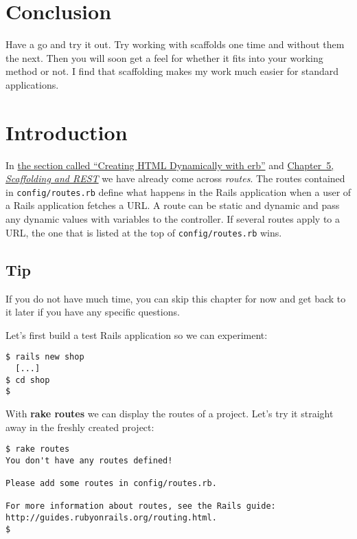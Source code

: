 \documentclass[a4paper]{book}
\newcommand{\chap}[1]{\newpage\thispagestyle{empty}\chapter{#1}\label{chap:\thechapter}}
\begin{document}
\section{Conclusion}\label{conclusion}

Have a go and try it out. Try working with scaffolds one time and without them the next. Then you will soon get a feel for whether it fits into your working method or not. I find that scaffolding makes my work much easier for standard applications.

\hyperdef{}{routes}{\chap{Routes}\label{routes}}

\section{Introduction}\label{introduction-2}

In \hyperref[dynamischeux5fwebseiten]{the section called “Creating HTML Dynamically with erb”} and \hyperref[scaffolding]{Chapter~5, \emph{Scaffolding and REST}} we have already come across \emph{routes}. The routes contained in \texttt{config/routes.rb} define what happens in the Rails application when a user of a Rails application fetches a URL. A route can be static and dynamic and pass any dynamic values with variables to the controller. If several routes apply to a URL, the one that is listed at the top of \texttt{config/routes.rb} wins.

\subsection{Tip}\label{tip-14}

If you do not have much time, you can skip this chapter for now and get back to it later if you have any specific questions.

Let's first build a test Rails application so we can experiment:

\begin{shaded}\begin{verbatim}
$ rails new shop
  [...]
$ cd shop
$
\end{verbatim}\end{shaded}

With \textbf{rake routes} we can display the routes of a project. Let's try it straight away in the freshly created project:

\begin{shaded}\begin{verbatim}
$ rake routes
You don't have any routes defined!

Please add some routes in config/routes.rb.

For more information about routes, see the Rails guide: http://guides.rubyonrails.org/routing.html.
$
\end{verbatim}\end{shaded}
\end{document}
